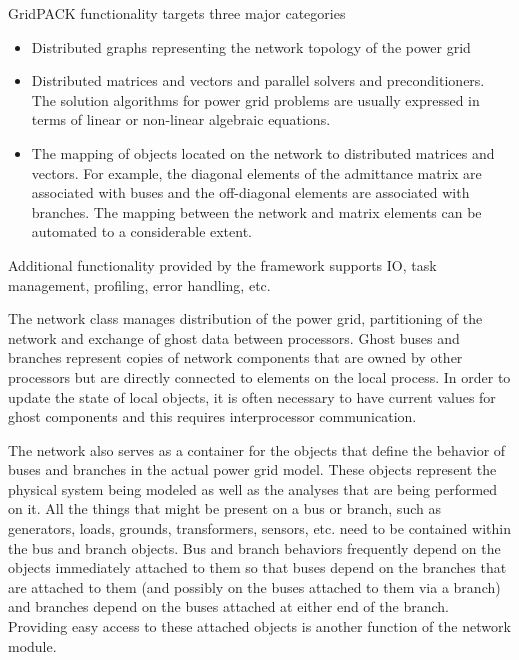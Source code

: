 \documentclass[preprint]{acm_proc_article-sp}
\begin{document}
GridPACK functionality targets three major categories
\begin{itemize}
\item Distributed graphs representing the network topology of the power grid
\item Distributed matrices and vectors and parallel solvers and
preconditioners. The solution algorithms for power grid problems are usually
expressed in terms of linear or non-linear algebraic equations. 
\item The mapping of objects located on the network to distributed matrices and vectors.
For example, the diagonal elements of the admittance matrix are associated with
buses and the off-diagonal elements are associated with branches. The mapping
between the network and matrix elements can be automated to a considerable
extent.
\end{itemize}
Additional functionality provided by the framework supports IO, task management,
profiling, error handling, etc. 

The network class manages distribution of the power grid, partitioning of the
network and exchange of ghost data between processors. Ghost buses and branches
represent copies of network components that are owned by other processors but
are directly connected to elements on the local process. In order to update
the state of local objects, it is often necessary to have current values for
ghost components and this requires interprocessor communication.

The network also serves as a container for the objects that define the behavior
of buses and branches in the actual power grid model. These objects represent
the physical system being modeled as well as the analyses that are being
performed on it. All the things that might be present on a bus or branch,
such as generators, loads, grounds, transformers, sensors, etc. need to be
contained within the bus and branch objects. Bus and branch behaviors frequently
depend on the objects immediately attached to them so that buses depend on the
branches that are attached to them (and possibly on the buses attached to them
via a branch) and branches depend on the buses attached at either end of the
branch. Providing easy access to these attached objects is another function of the
network module.
\end{document}
